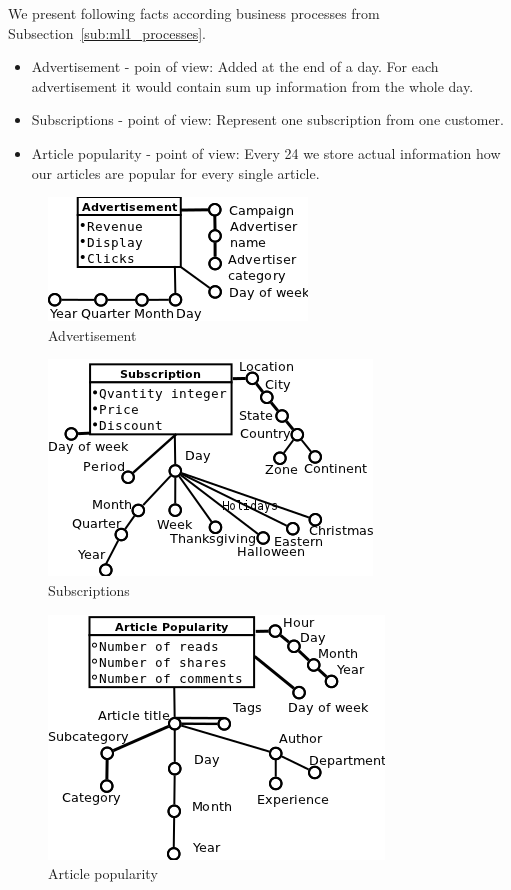 
We present following facts according business processes from  Subsection~\ref{sub:ml1_processes}.
\begin{itemize}
    \item Advertisement - poin of view: Added at the end of a day. For each advertisement it would contain sum up information from the whole day.
    \item Subscriptions - point of view: Represent one subscription from one customer.
    \item Article popularity - point of view: Every 24 we store
    actual information how our articles are popular for every single article.
\end{itemize}

\begin{figure}[!hbp]
\begin{center}
  \includegraphics[scale=0.5]{fact_advertisement}
\caption{\label{pic:f_adv}  Advertisement}
\end{center}
\end{figure}

\begin{figure}[!hbp]
\begin{center}
    \includegraphics[scale=0.5]{fact_subscriptions}
\caption{\label{pic:f_sub}  Subscriptions}
\end{center}
\end{figure}

\begin{figure}[!hbp]
\begin{center}
  \includegraphics[scale=0.5]{fact_article}
\caption{\label{pic:f_art}  Article popularity}
\end{center}
\end{figure}

